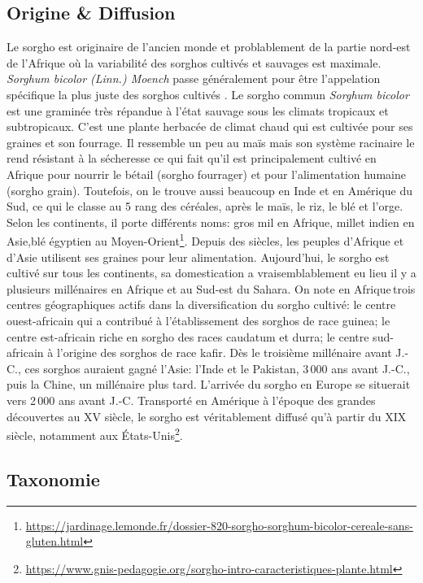 \documentclass[a4paper,11pt]{article}
\begin{document}
\subsection{Origine \& Diffusion}

Le sorgho est originaire de l'ancien monde et problablement de la
partie nord-est de l'Afrique où la variabilité des sorghos cultivés et
sauvages est maximale. \emph{ Sorghum bicolor (Linn.) Moench} passe
généralement pour être l'appelation spécifique la plus juste des
sorghos cultivés \cite{food1977introduction}. Le sorgho commun
\emph{Sorghum bicolor} est une graminée très répandue à l'état sauvage
sous les climats tropicaux et subtropicaux. C'est une plante herbacée
de climat chaud qui est cultivée pour ses graines et son fourrage. Il
ressemble un peu au maïs mais son système racinaire le rend résistant
à la sécheresse ce qui fait qu'il est principalement cultivé en
Afrique pour nourrir le bétail (sorgho fourrager) et pour
l'alimentation humaine (sorgho grain). Toutefois, on le trouve aussi
beaucoup en Inde et en Amérique du Sud, ce qui le classe au 5\ieme{}
rang des céréales, après le maïs, le riz, le blé et l'orge. Selon les
continents, il porte différents noms: \og{}gros mil\fg{} en Afrique,
\og{}millet indien\fg{} en Asie,\og{}blé égyptien\fg{} au
Moyen-Orient\footnote{\url{https://jardinage.lemonde.fr/dossier-820-sorgho-sorghum-bicolor-cereale-sans-gluten.html}}. Depuis
des siècles, les peuples d'Afrique et d'Asie utilisent ses graines
pour leur alimentation. Aujourd'hui, le sorgho est cultivé sur tous
les continents, sa domestication a vraisemblablement eu lieu il y a
plusieurs millénaires en Afrique et au Sud-est du Sahara. On note en
Afrique\,trois centres géographiques actifs dans la diversification du
sorgho cultivé: le centre ouest-africain qui a contribué à
l'établissement des sorghos de race guinea; le centre est-africain
riche en sorgho des races caudatum et durra; le centre sud-africain à
l'origine des sorghos de race kafir. Dès le troisième millénaire avant
J.-C., ces sorghos auraient gagné l'Asie: l'Inde et le Pakistan,
3\,000 ans avant J.-C., puis la Chine, un millénaire plus
tard. L'arrivée du sorgho en Europe se situerait vers 2\,000 ans avant
J.-C. Transporté en Amérique à l'époque des grandes découvertes au
XV\ieme{} siècle, le sorgho est véritablement diffusé qu'à partir du
XIX\ieme{} siècle, notamment aux
États-Unis\footnote{\url{https://www.gnis-pedagogie.org/sorgho-intro-caracteristiques-plante.html}}.

\subsection{Taxonomie}
\end{document}
